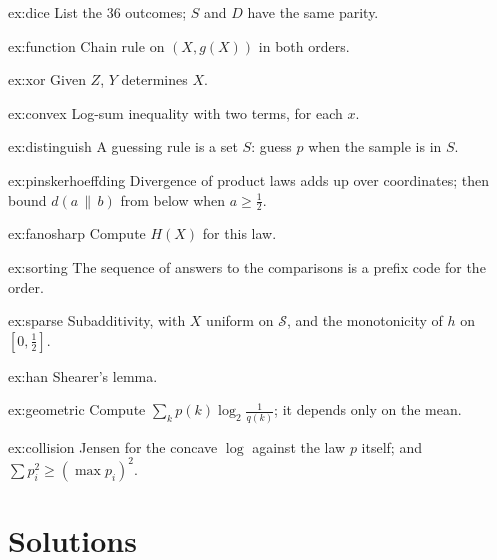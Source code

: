 \begin{hint}{ex:dice}
List the $36$ outcomes; $S$ and $D$ have the same parity.
\end{hint}
\begin{hint}{ex:function}
Chain rule on $(X,g(X))$ in both orders.
\end{hint}
\begin{hint}{ex:xor}
Given $Z$, $Y$ determines $X$.
\end{hint}
\begin{hint}{ex:convex}
Log-sum inequality with two terms, for each $x$.
\end{hint}
\begin{hint}{ex:distinguish}
A guessing rule is a set $S$: guess $p$ when the sample is in $S$.
\end{hint}
\begin{hint}{ex:pinskerhoeffding}
Divergence of product laws adds up over coordinates; then bound $d(a\,\|\,b)$ from below when $a\ge\frac12$.
\end{hint}
\begin{hint}{ex:fanosharp}
Compute $H(X)$ for this law.
\end{hint}
\begin{hint}{ex:sorting}
The sequence of answers to the comparisons is a prefix code for the order.
\end{hint}
\begin{hint}{ex:sparse}
Subadditivity, with $X$ uniform on $\mathcal S$, and the monotonicity of $h$ on $[0,\frac12]$.
\end{hint}
\begin{hint}{ex:han}
Shearer's lemma.
\end{hint}
\begin{hint}{ex:geometric}
Compute $\sum_kp(k)\log_2\frac1{q(k)}$; it depends only on the mean.
\end{hint}
\begin{hint}{ex:collision}
Jensen for the concave $\log$ against the law $p$ itself; and $\sum p_i^2\ge(\max p_i)^2$.
\end{hint}

\section{Solutions}

